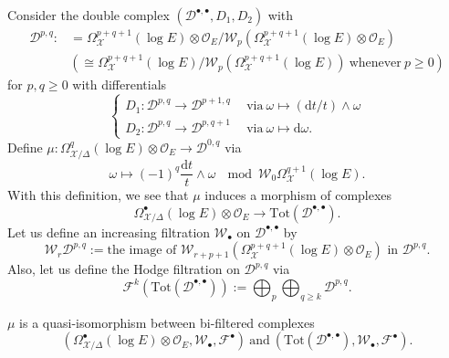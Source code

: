 Consider the double complex \((\mathcal{D}^{\bullet,\bullet},D_{1},D_{2})\) with
\begin{align*}
    \mathcal{D}^{p,q}:&=\Omega^{p+q+1}_{\mathcal{X}}(\log E)\otimes\mathscr{O}_{E}
    \slash \mathcal{W}_{p}(\Omega^{p+q+1}_{\mathcal{X}}(\log E)\otimes\mathscr{O}_{E})\\
    &\left(\cong 
    \Omega^{p+q+1}_{\mathcal{X}}(\log E)\slash \mathcal{W}_{p}(\Omega^{p+q+1}_{\mathcal{X}}(\log E))~
    \mbox{whenever}~p\ge 0\right)
\end{align*}
for \(p,q\ge 0\)
with differentials
\begin{equation*}
    \begin{cases}
        D_{1}\colon \mathcal{D}^{p,q}\to\mathcal{D}^{p+1,q}~~&\mbox{via}~\omega\mapsto (\mathrm{d}t\slash t)\wedge\omega\\
        D_{2}\colon \mathcal{D}^{p,q}\to\mathcal{D}^{p,q+1}~~&\mbox{via}~\omega\mapsto \mathrm{d}\omega.
    \end{cases}
\end{equation*}
Define \(\mu\colon \Omega^{q}_{\mathcal{X}\slash\Delta}(\log E)\otimes\mathscr{O}_{E}
\to \mathcal{D}^{0,q}\) via
\begin{equation*}
    \omega\mapsto (-1)^{q}\frac{\mathrm{d}t}{t}\wedge\omega~\mod{\mathcal{W}_{0}\Omega_{\mathcal{X}}^{q+1}(\log E)}.
\end{equation*}
With this definition, we see that
\(\mu\) induces a morphism of complexes
\begin{equation*}
    \Omega^{\bullet}_{\mathcal{X}\slash\Delta}(\log E)\otimes\mathscr{O}_{E} 
    \to \mathrm{Tot}(\mathcal{D}^{\bullet,\bullet}).
\end{equation*}
Let us define an increasing filtration 
\(\mathcal{W}_{\bullet}\) on \(\mathcal{D}^{\bullet,\bullet}\) by
\begin{equation*}
    \mathcal{W}_{r}\mathcal{D}^{p,q}:=\mbox{the image of \(\mathcal{W}_{r+p+1}
    (\Omega^{p+q+1}_{\mathcal{X}}(\log E)\otimes\mathscr{O}_{E})\) in \(\mathcal{D}^{p,q}\)}.
\end{equation*}
Also, let us define the Hodge filtration on \(\mathcal{D}^{p,q}\) via
\begin{equation*}
    \mathcal{F}^{k}(\mathrm{Tot}(\mathcal{D}^{\bullet,\bullet})):=\bigoplus_{p}\bigoplus_{q\ge k}
    \mathcal{D}^{p,q}.
\end{equation*}

\begin{theorem}
\label{thm:quasi-iso}
\(\mu\) is a quasi-isomorphism between bi-filtered complexes
\begin{equation*}
(\Omega^{\bullet}_{\mathcal{X}\slash\Delta}(\log E)\otimes
\mathscr{O}_{E},\mathcal{W}_{\bullet},\mathcal{F}^{\bullet})~\mbox{and}~    
(\mathrm{Tot}(\mathcal{D}^{\bullet,\bullet}),\mathcal{W}_{\bullet},\mathcal{F}^{\bullet}).
\end{equation*}
\end{theorem}

